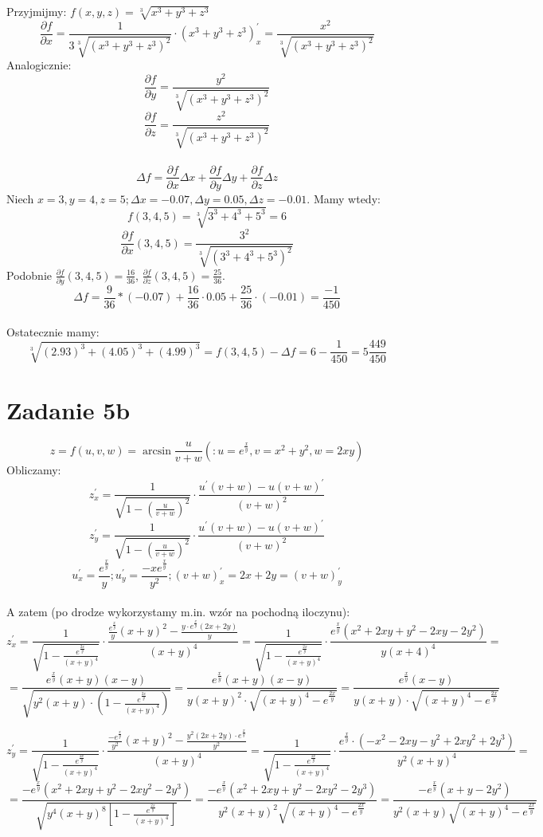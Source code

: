 \documentclass{article}
\begin{document}
Przyjmijmy: $f(x,y,z) = \sqrt[3]{x^3+y^3+z^3}$
$$\frac{\partial f}{\partial x} = \frac{1}{3\sqrt[3]{(x^3+y^3+z^3)^2}} \cdot (x^3+y^3+z^3)^{'}_{x} = \frac{x^2}{\sqrt[3]{(x^3+y^3+z^3)^2}}$$
Analogicznie:
$$\frac{\partial f}{\partial y} = \frac{y^2}{\sqrt[3]{(x^3+y^3+z^3)^2}}$$
$$\frac{\partial f}{\partial z} = \frac{z^2}{\sqrt[3]{(x^3+y^3+z^3)^2}}$$ \\
$$\Delta f = \frac{\partial f}{\partial x} \Delta x + \frac{\partial f}{\partial y} \Delta y + \frac{\partial f}{\partial z} \Delta z$$
Niech $x = 3, y = 4, z = 5; \Delta x = -0.07, \Delta y = 0.05, \Delta z = -0.01$. Mamy wtedy:
$$f(3,4,5) = \sqrt[3]{3^3+4^3+5^3} = 6$$
$$\frac{\partial f}{\partial x} (3,4,5) = \frac{3^2}{\sqrt[3]{(3^3+4^3+5^3)^2}}$$
Podobnie $\frac{\partial f}{\partial y} (3,4,5) = \frac{16}{36}$, $\frac{\partial f}{\partial z} (3,4,5) = \frac{25}{36}$.
$$\Delta f = \frac{9}{36} * (-0.07) + \frac{16}{36} \cdot 0.05 + \frac{25}{36} \cdot (-0.01) = \frac{-1}{450}$$ \\
Ostatecznie mamy:
$$\sqrt[3]{(2.93)^3 +(4.05)^3 + (4.99)^3} = f(3,4,5) - \Delta f = 6 - \frac{1}{450} = 5\frac{449}{450}$$

\section*{Zadanie 5b}

$$z = f(u,v,w) = \arcsin{\frac{u}{v+w}} (:u = e^{\frac{x}{y}}, v = x^2+y^2, w = 2xy)$$
Obliczamy:
$$z^{'}_{x} = \frac{1}{\sqrt{1-(\frac{u}{
v+w})^2}} \cdot \frac{u^{'}(v+w)-u(v+w)^{'}}{(v+w)^2}$$
$$z^{'}_{y} = \frac{1}{\sqrt{1-(\frac{u}{v+w})^2}} \cdot \frac{u^{'}(v+w)-u(v+w)^{'}}{(v+w)^2}$$
$$u^{'}_{x} = \frac{e^{\frac{x}{y}}}{y}; u^{'}_{y} = \frac{-xe^{\frac{x}{y}}}{y^2}; (v+w)^{'}_x = 2x+2y = (v+w)^{'}_y$$ \\
A zatem (po drodze wykorzystamy m.in. wzór na pochodną iloczynu):
$$z^{'}_{x} = \frac{1}{\sqrt{1-\frac{e^{\frac{2x}{y}}}{(x+y)^4}}} \cdot \frac{ \frac{e^{\frac{x}{y}}}{y} (x+y)^2 - \frac{y \cdot e^{\frac{x}{y}} (2x+2y)}{y}}{(x+y)^4} = \frac{1}{\sqrt{1-\frac{e^{\frac{2x}{y}}}{(x+y)^4}}} \cdot \frac{e^{\frac{x}{y}} (x^2+2xy+y^2-2xy-2y^2)}{y(x+4)^4} = $$
$$= \frac{e^{\frac{x}{y}} (x+y)(x-y)}{\sqrt{y^2(x+y) \cdot (1 - \frac{e^{\frac{2x}{y}}}{(x+y)^4})}} = \frac{e^{\frac{x}{y}} (x+y)(x-y)}{y(x+y)^2 \cdot \sqrt{(x+y)^4 - e^{\frac{2x}{y}}}} = \frac{e^{\frac{x}{y}}(x-y)}{y(x+y) \cdot \sqrt{(x+y)^4 - e^{\frac{2x}{y}}}}$$

$$z^{'}_{y} = \frac{1}{\sqrt{1-\frac{e^{\frac{2x}{y}}}{(x+y)^4}}} \cdot \frac{ \frac{-e^{\frac{x}{y}}}{y^2} (x+y)^2 - \frac{y^2 (2x+2y) \cdot e^{\frac{x}{y}}}{y^2} }{(x+y)^4}
= \frac{1}{\sqrt{1-\frac{e^{\frac{2x}{y}}}{(x+y)^4}}} \cdot \frac{e^{\frac{x}{y}} \cdot (-x^2-2xy-y^2+2xy^2+2y^3)}{y^2(x+y)^4} = $$ 
$$= \frac{-e^{\frac{x}{y}} (x^2+2xy+y^2-2xy^2-2y^3)}{\sqrt{y^4 (x+y)^8 [1-\frac{e^{\frac{2x}{y}}}{(x+y)^4}]}} = \frac{-e^{\frac{x}{y}} (x^2+2xy+y^2-2xy^2-2y^3)}{y^2 (x+y)^2 \sqrt{(x+y)^4 - e^{\frac{2x}{y}}}} = \frac{-e^{\frac{x}{y}}(x+y-2y^2)}{y^2 (x+y) \sqrt{(x+y)^4 - e^{\frac{2x}{y}}}}$$
\end{document}
